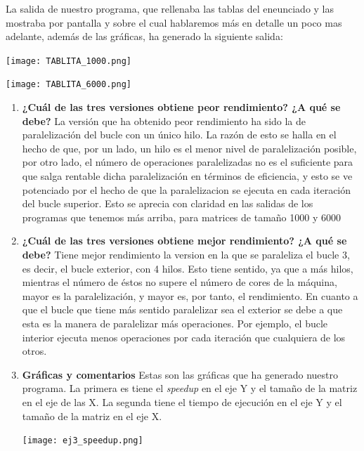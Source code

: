 \documentclass{report}
\newcommand\tab[1][0.6cm]{\hspace*{#1}}
\newcommand\nl{\newline\tab}
\begin{document}
	\tab La salida de nuestro programa, que rellenaba las tablas del eneunciado y las mostraba por pantalla y sobre el cual hablaremos más en detalle un poco mas adelante, además de las gráficas, ha generado la siguiente salida:\newline
	\begin{center}
		\texttt{[image: TABLITA\_1000.png]}
	\end{center}
	
	\begin{center}
		\texttt{[image: TABLITA\_6000.png]}
	\end{center}
	
	\begin{enumerate}
		\item{\textbf{\tab ¿Cuál	de	las	tres	versiones	obtiene	peor	rendimiento?	¿A	qué	se	debe?}\nl
			La versión que ha obtenido peor rendimiento ha sido la de paralelización del bucle  con un único hilo. La razón de esto se halla en el hecho de que, por un lado, un hilo es el menor nivel de paralelización posible, por otro lado, el número de operaciones paralelizadas no es el suficiente para que salga rentable dicha paralelización en términos de eficiencia, y esto se ve potenciado por el hecho de que la paralelizacion se ejecuta en cada iteración del bucle superior. Esto se aprecia con claridad en las salidas de los programas que tenemos más arriba, para matrices de tamaño 1000 y 6000}
		
		
		
		\item{\textbf{\tab ¿Cuál	de	las	tres	versiones	obtiene	mejor	rendimiento?	¿A	qué	se	debe?}\nl
			Tiene mejor rendimiento la version en la que se paraleliza el bucle 3, es decir, el bucle exterior, con 4 hilos. Esto tiene sentido, ya que a más hilos, mientras el número de éstos no supere el número de cores de la máquina, mayor es la paralelización, y mayor es, por tanto, el rendimiento. En cuanto a que el bucle que tiene más sentido paralelizar sea el exterior se debe a que esta es la manera de paralelizar más operaciones. Por ejemplo, el bucle interior ejecuta menos operaciones por cada iteración que cualquiera de los otros.}
		\newpage
		\item{\textbf{\tab Gráficas y comentarios}\nl
			\newline \tab
			Estas son las gráficas que ha generado nuestro programa. La primera es tiene el \textit{speedup} en el eje Y y el tamaño de la matriz en el eje de las X. La segunda tiene el tiempo de ejecución en el eje Y y el tamaño de la matriz en el eje X.\newline
			\begin{center}
				\texttt{[image: ej3\_speedup.png]}
			\end{center}
			
}
\end{enumerate}
\end{document}
